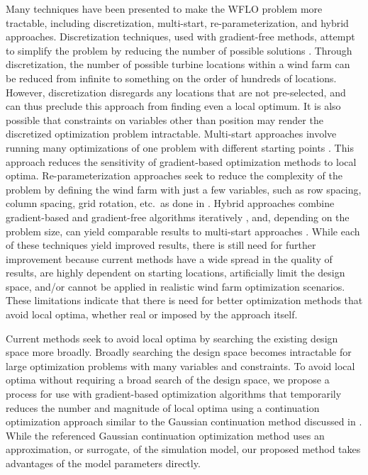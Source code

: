 \documentclass{jpconf}
\begin{document}
Many techniques have been presented to make the WFLO problem more tractable, including discretization, multi-start, re-parameterization, and hybrid approaches. Discretization techniques, used with gradient-free methods, attempt to simplify the problem by reducing the number of possible solutions \cite{mosetti1994, grady2005}. Through discretization, the number of possible turbine locations within a wind farm can be reduced from infinite to something on the order of hundreds of locations. However, discretization disregards any locations that are not pre-selected, and can thus preclude this approach from finding even a local optimum. It is also possible that constraints on variables other than position may render the discretized optimization problem intractable. Multi-start approaches involve running many optimizations of one problem with different starting points \cite{gonzalez2014}. This approach reduces the sensitivity of gradient-based optimization methods to local optima. Re-parameterization approaches seek to reduce the complexity of the problem by defining the wind farm with just a few variables, such as row spacing, column spacing, grid rotation, etc.~as done in \cite{stanley2020}. Hybrid approaches combine gradient-based and gradient-free algorithms iteratively \cite{rethore2014,graf2016, mittal2017}, and, depending on the problem size, can yield comparable results to multi-start approaches \cite{rethore2014}. While each of these techniques yield improved results, there is still need for further improvement because current methods have a wide spread in the quality of results, are highly dependent on starting locations, artificially limit the design space, and/or cannot be applied in realistic wind farm optimization scenarios. These limitations indicate that there is need for better optimization methods that avoid local optima, whether real or imposed by the approach itself.

Current methods seek to avoid local optima by searching the existing design space more broadly. Broadly searching the design space becomes intractable for large optimization problems with many variables and constraints. To avoid local optima without requiring a broad search of the design space, we propose a process for use with gradient-based optimization algorithms that temporarily reduces the number and magnitude of local optima using a continuation optimization approach similar to the Gaussian continuation method discussed in \cite{mobahi2015}. While the referenced Gaussian continuation optimization method uses an approximation, or surrogate, of the simulation model, our proposed method takes advantages of the model parameters directly. 
\end{document}
